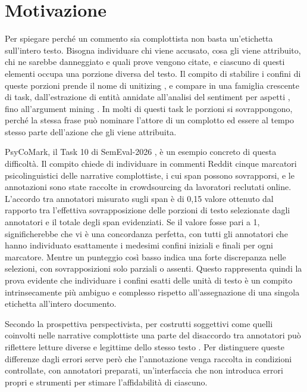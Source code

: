 \documentclass[]{sapthesis}
\begin{document}
\section{Motivazione}
\label{sec:motivazione}

Per spiegare perché un commento sia complottista non basta un'etichetta sull'intero testo. Bisogna individuare chi viene accusato, cosa gli viene attribuito, chi ne sarebbe danneggiato e quali prove vengono citate, e ciascuno di questi elementi occupa una porzione diversa del testo. Il compito di stabilire i confini di queste porzioni prende il nome di unitizing \parencite{krippendorff2016unitizing}, e compare in una famiglia crescente di task, dall'estrazione di entità annidate \parencite{finkel2009nested} all'analisi del sentiment per aspetti \parencite{zhang2023absa}, fino all'argument mining \parencite{stab2017argument}. In molti di questi task le porzioni si sovrappongono, perché la stessa frase può nominare l'attore di un complotto ed essere al tempo stesso parte dell'azione che gli viene attribuita.

PsyCoMark, il Task 10 di SemEval-2026 \parencite{samory2026psycomark}, è un esempio concreto di questa difficoltà. Il compito chiede di individuare in commenti Reddit cinque marcatori psicolinguistici delle narrative complottiste, i cui span possono sovrapporsi, e le annotazioni sono state raccolte in crowdsourcing da lavoratori reclutati online. L'accordo tra annotatori misurato sugli span è di 0,15 valore ottenuto dal rapporto tra l'effettiva sovrapposizione delle porzioni di testo selezionate dagli annotatori e il totale degli span evidenziati. Se il valore fosse pari a 1, significherebbe che vi è una concordanza perfetta, con tutti gli annotatori che hanno individuato esattamente i medesimi confini iniziali e finali per ogni marcatore. Mentre un punteggio così basso indica una forte discrepanza nelle selezioni, con sovrapposizioni solo parziali o assenti. Questo rappresenta quindi la prova evidente che individuare i confini esatti delle unità di testo è un compito intrinsecamente più ambiguo e complesso rispetto all'assegnazione di una singola etichetta all'intero documento.

Secondo la prospettiva perspectivista, per costrutti soggettivi come quelli coinvolti nelle narrative complottiste una parte del disaccordo tra annotatori può riflettere letture diverse e legittime dello stesso testo \parencite{cabitza2023perspectivist}. Per distinguere queste differenze dagli errori serve però che l'annotazione venga raccolta in condizioni controllate, con annotatori preparati, un'interfaccia che non introduca errori propri e strumenti per stimare l'affidabilità di ciascuno.
\end{document}
